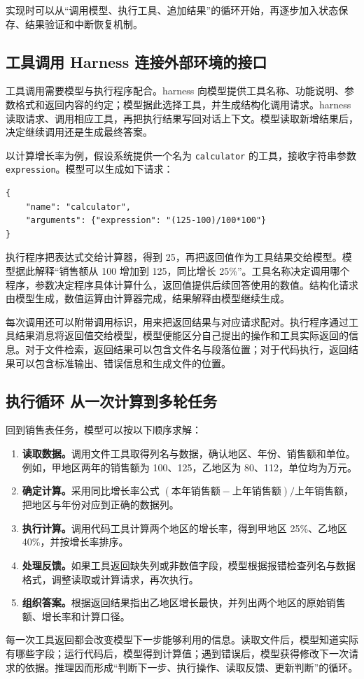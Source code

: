 实现时可以从``调用模型、执行工具、追加结果''的循环开始，再逐步加入状态保存、结果验证和中断恢复机制。

\subsection{工具调用 Harness 连接外部环境的接口}

工具调用需要模型与执行程序配合。harness 向模型提供工具名称、功能说明、参数格式和返回内容的约定；模型据此选择工具，并生成结构化调用请求。harness 读取请求、调用相应工具，再把执行结果写回对话上下文。模型读取新增结果后，决定继续调用还是生成最终答案。

以计算增长率为例，假设系统提供一个名为 \texttt{calculator} 的工具，接收字符串参数 \texttt{expression}。模型可以生成如下请求：
\begin{verbatim}
{
    "name": "calculator",
    "arguments": {"expression": "(125-100)/100*100"}
}
\end{verbatim}
执行程序把表达式交给计算器，得到 25，再把返回值作为工具结果交给模型。模型据此解释``销售额从 100 增加到 125，同比增长 25\%''。工具名称决定调用哪个程序，参数决定程序具体计算什么，返回值提供后续回答使用的数值。结构化请求由模型生成，数值运算由计算器完成，结果解释由模型继续生成。

每次调用还可以附带调用标识，用来把返回结果与对应请求配对。执行程序通过工具结果消息将返回值交给模型，模型便能区分自己提出的操作和工具实际返回的信息。对于文件检索，返回结果可以包含文件名与段落位置；对于代码执行，返回结果可以包含标准输出、错误信息和生成文件的位置。

\subsection{执行循环 从一次计算到多轮任务}

回到销售表任务，模型可以按以下顺序求解：
\begin{enumerate}
    \item \textbf{读取数据。}调用文件工具取得列名与数据，确认地区、年份、销售额和单位。例如，甲地区两年的销售额为 100、125，乙地区为 80、112，单位均为万元。
    \item \textbf{确定计算。}采用同比增长率公式 $(\text{本年销售额}-\text{上年销售额})/\text{上年销售额}$，把地区与年份对应到正确的数据列。
    \item \textbf{执行计算。}调用代码工具计算两个地区的增长率，得到甲地区 25\%、乙地区 40\%，并按增长率排序。
    \item \textbf{处理反馈。}如果工具返回缺失列或非数值字段，模型根据报错检查列名与数据格式，调整读取或计算请求，再次执行。
    \item \textbf{组织答案。}根据返回结果指出乙地区增长最快，并列出两个地区的原始销售额、增长率和计算口径。
\end{enumerate}
每一次工具返回都会改变模型下一步能够利用的信息。读取文件后，模型知道实际有哪些字段；运行代码后，模型得到计算值；遇到错误后，模型获得修改下一次请求的依据。推理因而形成``判断下一步、执行操作、读取反馈、更新判断''的循环。

